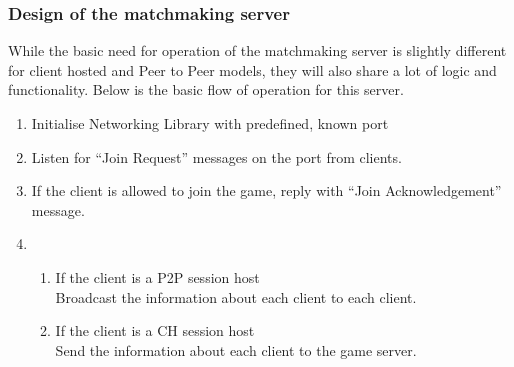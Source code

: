 \subsubsection{Design of the matchmaking server}
While the basic need for operation of the matchmaking server is slightly different for client hosted and Peer to Peer models, they will also share a lot of logic and functionality. Below is the basic flow of operation for this server.
\begin{enumerate}
\item Initialise Networking Library with predefined, known port
\item Listen for ``Join Request'' messages on the port from clients.
\item If the client is allowed to join the game, reply with ``Join Acknowledgement'' message.
\item \begin{enumerate}
  \item If the client is a P2P session host\\
     Broadcast the information about each client to each client.

  \item If the client is a CH session host\\
     Send the information about each client to the game server.
  \end{enumerate}
\end{enumerate}

